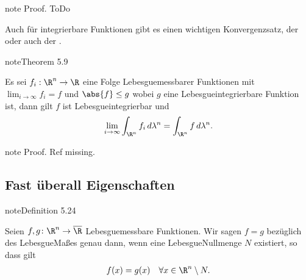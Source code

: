 \documentclass[letterpaper,10pt,german]{jupyterBook}
\begin{document}
\begin{sphinxadmonition}{note}
\sphinxAtStartPar
Proof. ToDo
\end{sphinxadmonition}

\sphinxAtStartPar
Auch für integrierbare Funktionen gibt es einen wichtigen Konvergenzsatz, der  oder auch der .
\label{masstheorie/lebesgue_integral:theorem-18}
\begin{sphinxadmonition}{note}{Theorem 5.9}



\sphinxAtStartPar
Es sei \(f_i:\R^n\to\R\) eine Folge Lebesgue\sphinxhyphen{}messbarer Funktionen mit \(\lim_{i\to\infty} f_i =f\) und \(\abs{f}\leq g\) wobei \(g\) eine Lebesgue\sphinxhyphen{}integrierbare Funktion ist, dann gilt \(f\) ist Lebesgue\sphinxhyphen{}integrierbar und
\begin{equation*}
\begin{split}\lim_{i\to\infty} \int_{\R^n} f_i\, d\lambda^n = \int_{\R^n} f\, d\lambda^n.\end{split}
\end{equation*}\end{sphinxadmonition}

\begin{sphinxadmonition}{note}
\sphinxAtStartPar
Proof. Ref missing.
\end{sphinxadmonition}


\subsection{Fast überall Eigenschaften}
\label{\detokenize{masstheorie/lebesgue_integral:fast-uberall-eigenschaften}}\label{masstheorie/lebesgue_integral:definition-19}
\begin{sphinxadmonition}{note}{Definition 5.24}



\sphinxAtStartPar
Seien \(f,g \colon \R^n \rightarrow \overline{\R}\) Lebesgue\sphinxhyphen{}messbare Funktionen.
Wir sagen \(f = g\)  bezüglich des Lebesgue\sphinxhyphen{}Maßes genau dann, wenn eine Lebesgue\sphinxhyphen{}Nullmenge \(N\) existiert, so dass gilt
\begin{equation*}
\begin{split}f(x) = g(x) \quad \forall x \in \R^n \setminus N.\end{split}
\end{equation*}\end{sphinxadmonition}
\end{document}
